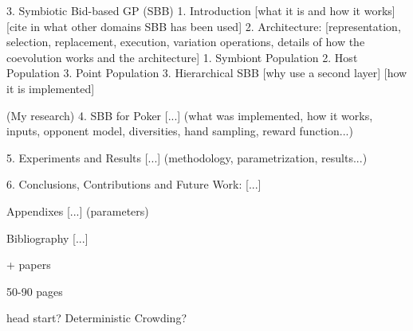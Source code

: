 3. Symbiotic Bid-based GP (SBB)
    1. Introduction
        [what it is and how it works]
        [cite in what other domains SBB has been used]
    2. Architecture: [representation, selection, replacement, execution, variation operations, details of how the coevolution works and the architecture]
        1. Symbiont Population
        2. Host Population
        3. Point Population        
    3. Hierarchical SBB
        [why use a second layer]
        [how it is implemented]

(My research)
4. SBB for Poker
[...] (what was implemented, how it works, inputs, opponent model, diversities, hand sampling, reward function...)

5. Experiments and Results
[...] (methodology, parametrization, results...)

6. Conclusions, Contributions and Future Work:
[...]

Appendixes
[...] (parameters)

Bibliography
[...]


+ papers

50-90 pages

head start?
Deterministic Crowding?